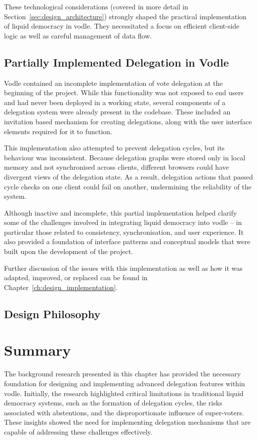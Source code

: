 These technological considerations (covered in more detail in Section~\ref{sec:design_architecture}) strongly shaped the practical implementation of liquid democracy in vodle. They necessitated a focus on efficient client-side logic as well as careful management of data flow.

\subsection{Partially Implemented Delegation in Vodle}\label{subsec:background_existing_delegation}
Vodle contained an incomplete implementation of vote delegation at the beginning of the project. While this functionality was not exposed to end users and had never been deployed in a working state, several components of a delegation system were already present in the codebase. These included an invitation based mechanism for creating delegations, along with the user interface elements required for it to function.

This implementation also attempted to prevent delegation cycles, but its behaviour was inconsistent. Because delegation graphs were stored only in local memory and not synchronised across clients, different browsers could have divergent views of the delegation state. As a result, delegation actions that passed cycle checks on one client could fail on another, undermining the reliability of the system.

Although inactive and incomplete, this partial implementation helped clarify some of the challenges involved in integrating liquid democracy into vodle -- in particular those related to consistency, synchronisation, and user experience. It also provided a foundation of interface patterns and conceptual models that were built upon the development of the project.

Further discussion of the issues with this implementation as well as how it was adapted, improved, or replaced can be found in Chapter~\ref{ch:design_implementation}.
\subsection{Design Philosophy}


\section{Summary}
The background research presented in this chapter has provided the necessary foundation for designing and implementing advanced delegation features within vodle. Initially, the research highlighted critical limitations in traditional liquid democracy systems, such as the formation of delegation cycles, the risks associated with abstentions, and the disproportionate influence of super-voters. These insights showed the need for implementing delegation mechanisms that are capable of addressing these challenges effectively.

